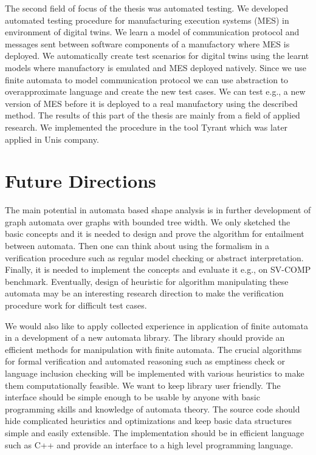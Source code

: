 {The second field of focus of the thesis was automated testing.
We developed automated testing procedure for manufacturing execution systems (MES)
in environment of digital twins.
We learn a model of communication protocol and messages sent between software components
of a manufactory where MES is deployed.
We automatically create test scenarios for digital twins using the learnt models
where manufactory is emulated and MES deployed natively.
Since we use finite automata to model communication protocol we can use abstraction to
overapproximate language and create the new test cases.
We can test e.g., a new version of MES before it is deployed to a real manufactory using the described method.
The results of this part of the thesis are mainly from a field of applied research.
We implemented the procedure in the tool Tyrant \cite{ref_tyrant} which was later applied
in Unis company.

\section{Future Directions}
The main potential in automata based shape analysis is in further development
of graph automata over graphs with bounded tree width.
We only sketched the basic concepts and it is needed to design and prove the algorithm
for entailment between automata.
Then one can think about using the formalism in a verification procedure such as
regular model checking or abstract interpretation.
Finally, it is needed to implement the concepts and evaluate it e.g., on SV-COMP
benchmark.
Eventually, design of heuristic for algorithm manipulating these automata may be
an interesting research direction to make the verification procedure work for
difficult test cases.

We would also like to apply collected experience in application of finite automata
in a development of a new automata library.
The library should provide an efficient methods for
manipulation with finite automata.
The crucial algorithms for formal verification and automated reasoning
such as emptiness check or language inclusion checking will be implemented
with various heuristics to make them computationally feasible.
We want to keep library user friendly.
The interface should be simple enough to be usable by anyone with basic
programming skills and knowledge of automata theory.
The source code should hide complicated heuristics and optimizations
and keep basic data structures simple and easily extensible.
The implementation should be in efficient language such as C++ and provide
an interface to a high level programming language.

}
